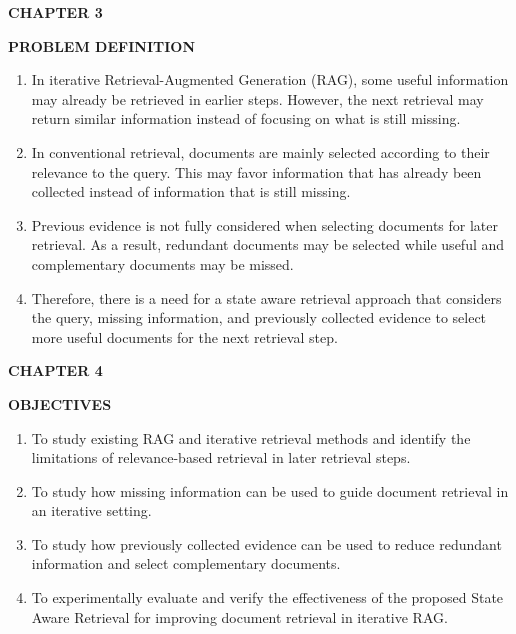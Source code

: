 \documentclass[12pt,a4paper]{report}
\newcommand{\chaptertitle}[2]{
    \begin{center}
        {\fontsize{18}{21}\selectfont\bfseries CHAPTER #1\par}
        \vspace{0.10in}
        {\fontsize{18}{21}\selectfont\bfseries #2\par}
    \end{center}
    \vspace{0.12in}
}
\begin{document}



\chaptertitle{3}{PROBLEM DEFINITION}
\justifying

\begin{enumerate}[leftmargin=0.30in,itemsep=0.12in,parsep=0pt]

\item
In iterative Retrieval-Augmented Generation (RAG), some useful information may already be retrieved in earlier steps. However, the next retrieval may return similar information instead of focusing on what is still missing.

\item
In conventional retrieval, documents are mainly selected according to their relevance to the query. This may favor information that has already been collected instead of information that is still missing.

\item
Previous evidence is not fully considered when selecting documents for later retrieval. As a result, redundant documents may be selected while useful and complementary documents may be missed.

\item
Therefore, there is a need for a state aware retrieval approach that considers the query, missing information, and previously collected evidence to select more useful documents for the next retrieval step.

\end{enumerate}
\clearpage





\chaptertitle{4}{OBJECTIVES}

\begin{enumerate}[leftmargin=0.30in,itemsep=0.12in,parsep=0pt]

\item
To study existing RAG and iterative retrieval methods and identify the limitations of relevance-based retrieval in later retrieval steps.

\item
To study how missing information can be used to guide document retrieval in an iterative setting.

\item
To study how previously collected evidence can be used to reduce redundant information and select complementary documents.

\item
To experimentally evaluate and verify the effectiveness of the proposed State Aware Retrieval for improving document retrieval in iterative RAG.

\end{enumerate}
\clearpage
\end{document}
